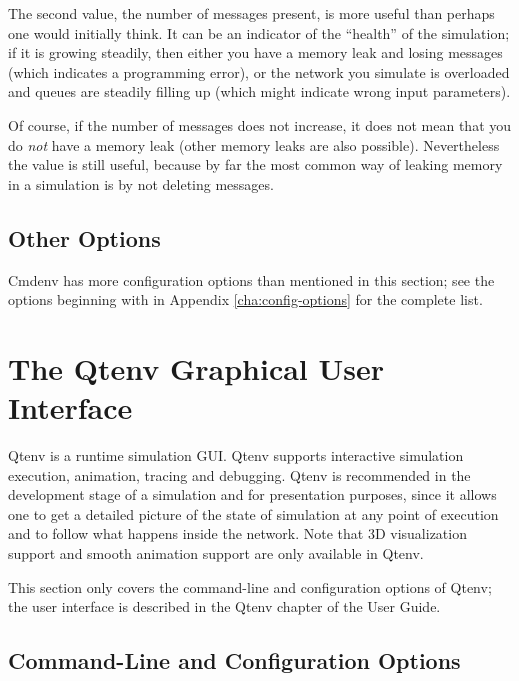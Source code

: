 The second value, the number of messages present, is more useful than
perhaps one would initially think. It can be an indicator of the ``health'' of the simulation;
if it is growing steadily, then either you have a memory leak and losing
messages (which indicates a programming error), or the network you simulate is
overloaded and queues are steadily filling up (which might indicate wrong input
parameters).

Of course, if the number of messages does not increase, it does not mean
that you do \textit{not} have a memory leak (other memory leaks are also
possible). Nevertheless the value is still useful, because by far the
most common way of leaking memory in a simulation is by not deleting messages.

\subsection{Other Options}
\label{sec:run-sim:cmdenv:other-options}

Cmdenv has more configuration options than mentioned in this section; see
the options beginning with  in Appendix \ref{cha:config-options}
for the complete list.


\section{The Qtenv Graphical User Interface}
\label{sec:run-sim:qtenv}

Qtenv is a runtime simulation GUI. Qtenv supports
interactive simulation execution, animation, tracing and debugging.
Qtenv is recommended in the development stage of a simulation and for
presentation purposes, since it allows one to get a detailed picture of the
state  of simulation at any point of execution and to follow what happens
inside the network. Note that 3D visualization support and smooth animation
support are only available in Qtenv.

\begin{note}
This section only covers the command-line and configuration options
of Qtenv; the user interface is described in the Qtenv chapter of the
{\opp} User Guide.
\end{note}

\subsection{Command-Line and Configuration Options}
\label{sec:run-sim:qtenv-options}

